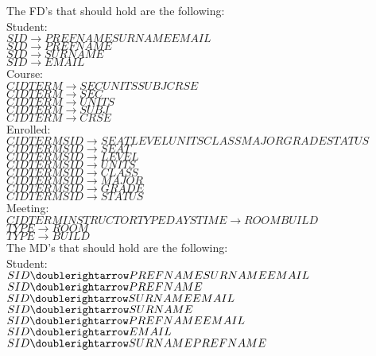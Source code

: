 
The FD's that should hold are the following:  \\

Student: \\
$SID \rightarrow PREFNAME SURNAME EMAIL  $ \\
$SID \rightarrow PREFNAME$ \\
$SID \rightarrow SURNAME$ \\
$SID \rightarrow EMAIL$ \\ 

Course: \\
$CID TERM \rightarrow SEC UNITS SUBJ CRSE$ \\
$CID TERM \rightarrow SEC$ \\
$CID TERM \rightarrow UNITS$ \\ 
$CID TERM \rightarrow SUBJ$ \\
$CID TERM \rightarrow CRSE$ \\

Enrolled: \\
$CID TERM SID \rightarrow SEAT LEVEL UNITS CLASS MAJOR GRADE STATUS$\\
$CID TERM SID \rightarrow SEAT$\\
$CID TERM SID \rightarrow LEVEL$\\
$CID TERM SID \rightarrow UNITS$\\
$CID TERM SID \rightarrow CLASS$\\
$CID TERM SID \rightarrow MAJOR$\\
$CID TERM SID \rightarrow GRADE$\\
$CID TERM SID \rightarrow STATUS$\\

Meeting: \\
$CID TERM INSTRUCTOR TYPE DAYS TIME \rightarrow ROOM BUILD$ \\
$TYPE \rightarrow ROOM$ \\
$TYPE \rightarrow BUILD$ \\


The MD's that should hold are the following: \\

Student: \\
$SID \doublerightarrow PREFNAME SURNAME EMAIL$ \\
$SID \doublerightarrow PREFNAME$ \\
$SID \doublerightarrow SURNAME EMAIL$ \\
$SID \doublerightarrow SURNAME$ \\
$SID \doublerightarrow PREFNAME EMAIL$ \\
$SID \doublerightarrow EMAIL$ \\ 
$SID \doublerightarrow SURNAME PREFNAME$ \\


